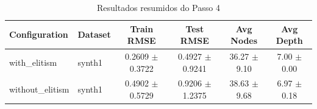 \begin{table}[htbp]
  \centering
  \caption{Resultados resumidos do Passo 4}
  \label{tab:step4}
  \begin{tabular}{llcccc}
    \toprule
    Configuration & Dataset & Train RMSE & Test RMSE & Avg Nodes & Avg Depth \\
    \midrule
    with\_elitism & synth1 & 0.2609 $\pm$ 0.3722 & 0.4927 $\pm$ 0.9241 & 36.27 $\pm$ 9.10 & 7.00 $\pm$ 0.00 \\
    without\_elitism & synth1 & 0.4902 $\pm$ 0.5729 & 0.9206 $\pm$ 1.2375 & 38.63 $\pm$ 9.68 & 6.97 $\pm$ 0.18 \\
    \bottomrule
  \end{tabular}
\end{table}
